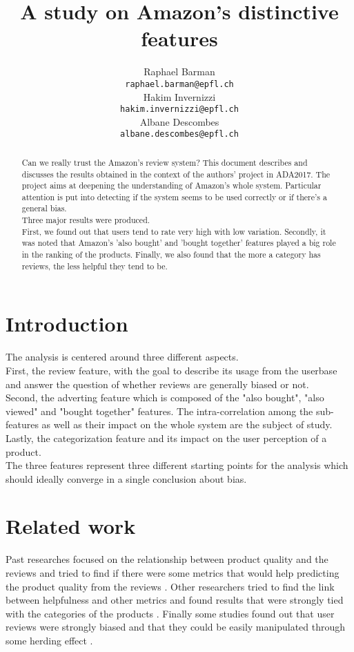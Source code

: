 \documentclass[11pt]{article}
\title{A study on Amazon's distinctive features}
\author{Raphael Barman \\
  {\tt raphael.barman@epfl.ch} \\\And
  Hakim Invernizzi \\
  {\tt hakim.invernizzi@epfl.ch} \\\And
Albane Descombes \\
{\tt albane.descombes@epfl.ch} \\}
\date{}
\begin{document}
\maketitle
\begin{abstract}
 Can we really trust the Amazon's review system? This document describes and discusses the results obtained in the context of the authors' project in ADA2017. The project aims at deepening the understanding 
  of Amazon's whole system. Particular attention is put into detecting if the system seems to be used correctly or if there's a general bias. \\
  Three major results were produced. \\
  First, we found out that users tend to rate very high with low variation. Secondly, it was noted that Amazon's 'also bought' and 'bought together' features played a big role in the ranking of the products. Finally, we also found that the more a category has reviews, the less helpful they tend to be.
\end{abstract}


\section{Introduction}
  The analysis is centered around three different aspects. \\ First, the review feature, with the goal to describe its usage from the userbase and answer the question of whether reviews are generally biased or not. \\ Second, the adverting feature which is composed of the "also bought", "also viewed" and "bought together" features. The intra-correlation among the sub-features as well as their impact on the whole system are the subject of study. \\ Lastly, the categorization feature and its impact on the user perception of a product. \\  The three features represent three different starting points for the analysis which should ideally converge in a single conclusion about bias.
  
\section{Related work}
Past researches focused on the relationship between product quality and the reviews and tried to find if there were some metrics that would help predicting the product quality from the reviews \cite{hu2006can}. Other researchers tried to find the link between helpfulness and other metrics and found results that were strongly tied with the categories of the products \cite{mudambi2010makes}. Finally some studies found out that user reviews were strongly biased and that they could be easily manipulated through some herding effect \cite{muchnik2013social}.
\end{document}
